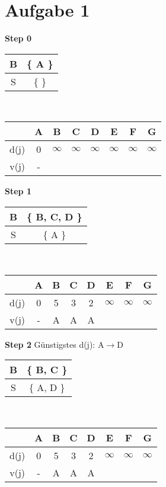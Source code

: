 \documentclass[a4paper,11pt]{article}
\begin{document}
\raggedright %
\setlength{\mathindent}{0cm} %

\section*{Aufgabe 1}

{\setlength{\columnseprule}{.1pt}
\setlength{\columnsep}{3cm}
\begin{multicols}{2}

\textbf{Step 0} \\
\begin{tabular}{ |c|c| } 
  \hline
  B & \{ A \} \\
  \hline
  S & \{  \} \\ 
  \hline
 \end{tabular} \\
\begin{tabular}{ |c|c|c|c|c|c|c|c| } 
  \hline
       & A & B & C & D & E & F & G \\
  \hline
  d(j) & 0 & $\infty$ & $\infty$ & $\infty$ & $\infty$ & $\infty$ & $\infty$ \\
  \hline
  v(j) & - &  &  &  &  &  &  \\
  \hline
\end{tabular}
\vspace{4mm}

\textbf{Step 1} \\
\begin{tabular}{ |c|c| } 
  \hline
  B & \{ B, C, D \} \\
  \hline
  S & \{ A \} \\ 
  \hline
 \end{tabular} \\
\begin{tabular}{ |c|c|c|c|c|c|c|c| } 
  \hline
       & A & B & C & D & E & F & G \\
  \hline
  d(j) & 0 & 5 & 3 & 2 & $\infty$ & $\infty$ & $\infty$ \\
  \hline
  v(j) & - & A & A & A &  &  &  \\
  \hline
\end{tabular}
\vspace{4mm}

\textbf{Step 2} Günstigstes d(j): A$\to$D \\
\begin{tabular}{ |c|c| } 
  \hline
  B & \{ B, C \} \\
  \hline
  S & \{ A, D \} \\ 
  \hline
 \end{tabular} \\
\begin{tabular}{ |c|c|c|c|c|c|c|c| } 
  \hline
       & A & B & C & D & E & F & G \\
  \hline
  d(j) & 0 & 5 & 3 & 2 & $\infty$ & $\infty$ & $\infty$ \\
  \hline
  v(j) & - & A & A & A &  &  &  \\
  \hline
\end{tabular}
\vspace{4mm}


\end{multicols}}
\end{document}
